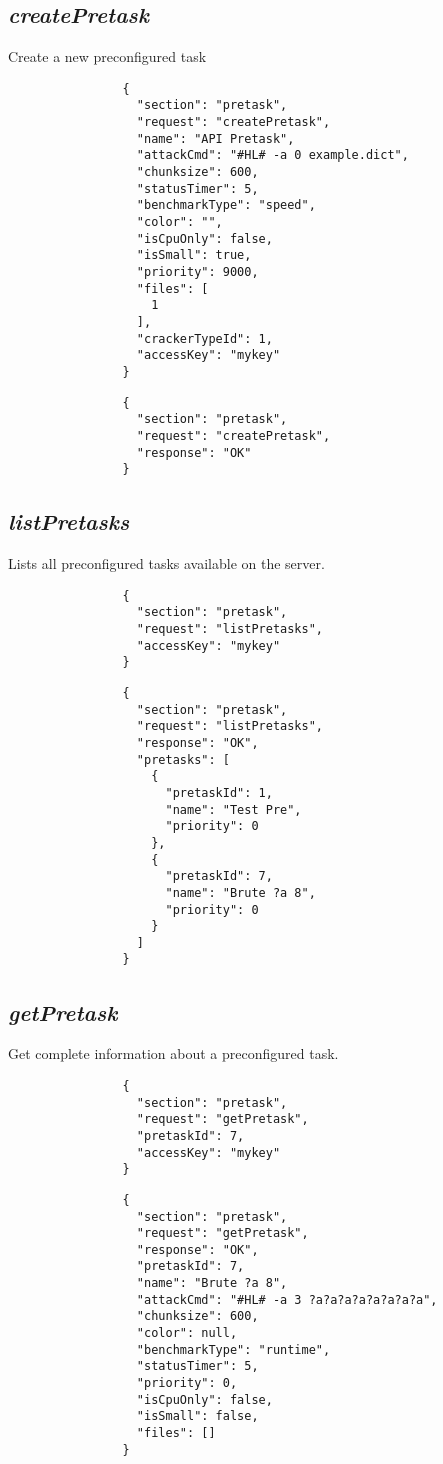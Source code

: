 		\subsection*{\textit{createPretask}}
			Create a new preconfigured task
			{
				\color{blue}
				\begin{verbatim}
				{
				  "section": "pretask",
				  "request": "createPretask",
				  "name": "API Pretask",
				  "attackCmd": "#HL# -a 0 example.dict",
				  "chunksize": 600,
				  "statusTimer": 5,
				  "benchmarkType": "speed",
				  "color": "",
				  "isCpuOnly": false,
				  "isSmall": true,
				  "priority": 9000,
				  "files": [
				    1
				  ],
				  "crackerTypeId": 1,
				  "accessKey": "mykey"
				}
				\end{verbatim}
			}
			{
				\color{OliveGreen}
				\begin{verbatim}
				{
				  "section": "pretask",
				  "request": "createPretask",
				  "response": "OK"
				}
				\end{verbatim}
			}
		\subsection*{\textit{listPretasks}}
			Lists all preconfigured tasks available on the server.
			{
				\color{blue}
				\begin{verbatim}
				{
				  "section": "pretask",
				  "request": "listPretasks",
				  "accessKey": "mykey"
				}
				\end{verbatim}
			}
			{
				\color{OliveGreen}
				\begin{verbatim}
				{
				  "section": "pretask",
				  "request": "listPretasks",
				  "response": "OK",
				  "pretasks": [
				    {
				      "pretaskId": 1,
				      "name": "Test Pre",
				      "priority": 0
				    },
				    {
				      "pretaskId": 7,
				      "name": "Brute ?a 8",
				      "priority": 0
				    }
				  ]
				}
				\end{verbatim}
			}
	\subsection*{\textit{getPretask}}
		Get complete information about a preconfigured task.
			{
				\color{blue}
				\begin{verbatim}
				{
				  "section": "pretask",
				  "request": "getPretask",
				  "pretaskId": 7,
				  "accessKey": "mykey"
				}
				\end{verbatim}
			}
			{
				\color{OliveGreen}
				\begin{verbatim}
				{
				  "section": "pretask",
				  "request": "getPretask",
				  "response": "OK",
				  "pretaskId": 7,
				  "name": "Brute ?a 8",
				  "attackCmd": "#HL# -a 3 ?a?a?a?a?a?a?a?a",
				  "chunksize": 600,
				  "color": null,
				  "benchmarkType": "runtime",
				  "statusTimer": 5,
				  "priority": 0,
				  "isCpuOnly": false,
				  "isSmall": false,
				  "files": []
				}
				\end{verbatim}
			}